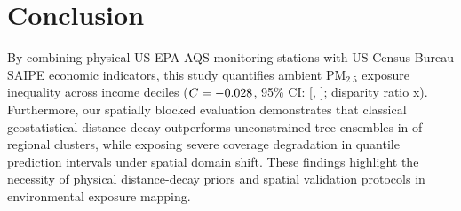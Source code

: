 \documentclass[conference]{IEEEtran}
\begin{document}
\section{Conclusion}
By combining \numStations{} physical US EPA AQS monitoring stations with US Census Bureau SAIPE economic indicators, this study quantifies ambient $\mathrm{PM}_{2.5}$ exposure inequality across income deciles ($C = -0.028{}$, 95\% CI: [\concCiLow{}, \concCiHigh{}]; disparity ratio \disparityRatio{}x). Furthermore, our spatially blocked evaluation demonstrates that classical geostatistical distance decay outperforms unconstrained tree ensembles in \idwBlockWins{} of \numClusters{} regional clusters, while exposing severe coverage degradation in quantile prediction intervals under spatial domain shift. These findings highlight the necessity of physical distance-decay priors and spatial validation protocols in environmental exposure mapping.



\end{document}
